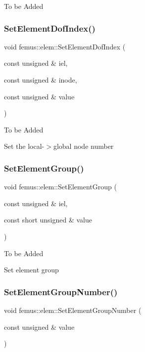 To be Added \mbox{\label{classfemus_1_1elem_acc9003e820ed0bcbf784e0910b911549}} 
\subsubsection{\texorpdfstring{Set\+Element\+Dof\+Index()}{SetElementDofIndex()}}
{\footnotesize\ttfamily void femus\+::elem\+::\+Set\+Element\+Dof\+Index (\begin{DoxyParamCaption}\item[{const unsigned \&}]{iel,  }\item[{const unsigned \&}]{inode,  }\item[{const unsigned \&}]{value }\end{DoxyParamCaption})}

To be Added

Set the local-\/$>$global node number \mbox{\label{classfemus_1_1elem_a950c41c56ffc7c95d951ef4649a45c5f}} 
\subsubsection{\texorpdfstring{Set\+Element\+Group()}{SetElementGroup()}}
{\footnotesize\ttfamily void femus\+::elem\+::\+Set\+Element\+Group (\begin{DoxyParamCaption}\item[{const unsigned \&}]{iel,  }\item[{const short unsigned \&}]{value }\end{DoxyParamCaption})}

To be Added

Set element group \mbox{\label{classfemus_1_1elem_a1485cf4c145f863dfadac833b51085b8}} 
\subsubsection{\texorpdfstring{Set\+Element\+Group\+Number()}{SetElementGroupNumber()}}
{\footnotesize\ttfamily void femus\+::elem\+::\+Set\+Element\+Group\+Number (\begin{DoxyParamCaption}\item[{const unsigned \&}]{value }\end{DoxyParamCaption})}

